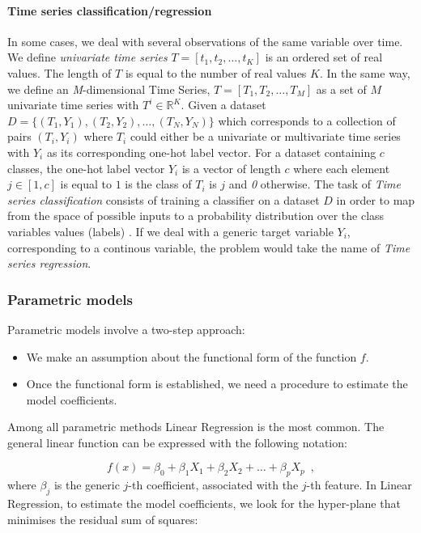 \paragraph{Time series classification/regression}

In some cases, we deal with several observations of the same variable over time. We define \textit{univariate time series} $T = [t_{1}, t_{2}, \dots, t_{K}]$ is an ordered set of real values. The length of $T$ is equal to the number of real values $K$. In the same way, we define an \textit{M}-dimensional Time Series, $T = [T_{1}, T_{2}, \dots, T_{M}]$ as a set of $M$ univariate time series with $T^{i} \in \mathbb{R}^{K}$. Given a dataset $D = \{(T_{1}, Y_{1}),(T_{2}, Y_{2}),\dots,(T_{N}, Y_{N})\}$ which corresponds to a collection of pairs $(T_{i}, Y_{i})$ where $T_i$ could either be a univariate or multivariate time series with $Y_{i}$ as its corresponding one-hot label vector. For a dataset containing $c$ classes, the one-hot label vector $Y_{i}$ is a vector of length $c$ where each element $j \in [1, c]$ is equal to $1$ is the class of $T_{i}$  is $j$ and \textit{0} otherwise. The task of \textit{Time series classification} consists of training a classifier on a dataset $D$ in order to map from the space of possible inputs to a probability distribution over the class variables values (labels) \citep{fawaz2019deep}. If we deal with a generic target variable $Y_{i}$, corresponding to a continous variable, the problem would take the name of \textit{Time series regression}. 


\subsubsection{Parametric models} \label{Parametric models}

Parametric models involve a two-step approach:
\begin{itemize}
    \item We make an assumption about the functional form of the function $f$.  
    \item Once the functional form is established, we need a procedure to estimate the model coefficients. 

\end{itemize}
	 
Among all parametric methods Linear Regression is the most common. The general linear function can be expressed with the following notation:

\begin{equation} \label{eq:linear_function}
    f(x)=\beta_0 + \beta_1X_1 + \beta_2X_2 + \ldots + \beta_pX_p
    \enspace,
\end{equation}
where $\beta_j$ is the generic $j$-th coefficient, associated with the $j$-th feature.
In Linear Regression, to estimate the model coefficients, we look for the hyper-plane that minimises the residual sum of squares:

